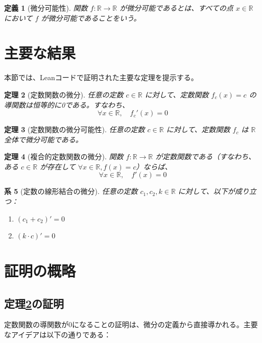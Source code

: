 \documentclass[uplatex, a4paper]{jlreq}
\newtheorem{theorem}{定理}[section]
\newtheorem{definition}[theorem]{定義}
\newtheorem{corollary}[theorem]{系}
\begin{document}
\begin{definition}[微分可能性]
関数 $f: \mathbb{R} \to \mathbb{R}$ が微分可能であるとは、すべての点 $x \in \mathbb{R}$ において $f$ が微分可能であることをいう。
\end{definition}

\section{主要な結果}

本節では、Leanコードで証明された主要な定理を提示する。

\begin{theorem}[定数関数の微分]\label{thm:const_deriv}
任意の定数 $c \in \mathbb{R}$ に対して、定数関数 $f_c(x) = c$ の導関数は恒等的に0である。すなわち、
\[
\forall x \in \mathbb{R}, \quad f_c'(x) = 0
\]
\end{theorem}

\begin{theorem}[定数関数の微分可能性]\label{thm:const_diff}
任意の定数 $c \in \mathbb{R}$ に対して、定数関数 $f_c$ は $\mathbb{R}$ 全体で微分可能である。
\end{theorem}

\begin{theorem}[複合的定数関数の微分]\label{thm:composite_const}
関数 $f: \mathbb{R} \to \mathbb{R}$ が定数関数である（すなわち、ある $c \in \mathbb{R}$ が存在して $\forall x \in \mathbb{R}, f(x) = c$）ならば、
\[
\forall x \in \mathbb{R}, \quad f'(x) = 0
\]
\end{theorem}

\begin{corollary}[定数の線形結合の微分]
任意の定数 $c_1, c_2, k \in \mathbb{R}$ に対して、以下が成り立つ：
\begin{enumerate}
\item $(c_1 + c_2)' = 0$
\item $(k \cdot c)' = 0$
\end{enumerate}
\end{corollary}

\section{証明の概略}

\subsection{定理\ref{thm:const_deriv}の証明}

定数関数の導関数が0になることの証明は、微分の定義から直接導かれる。主要なアイデアは以下の通りである：
\end{document}
